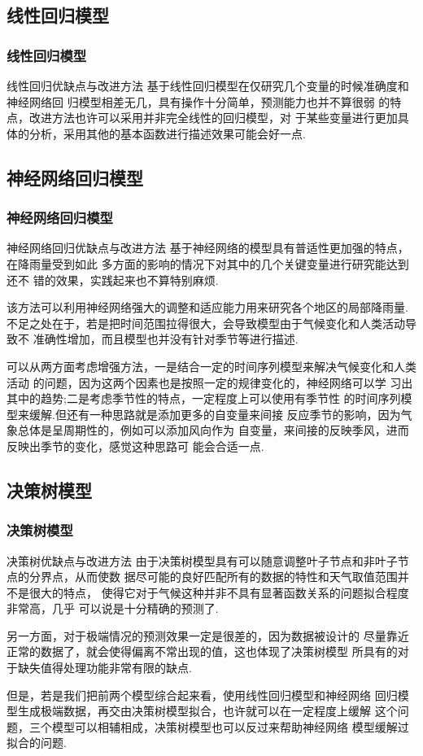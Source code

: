 \documentclass[10pt]{beamer}
\begin{document}
\subsection{线性回归模型}
\begin{frame}
	\frametitle{线性回归模型}
	\begin{block}{线性回归优缺点与改进方法}
		基于线性回归模型在仅研究几个变量的时候准确度和神经网络回
		归模型相差无几，具有操作十分简单，预测能力也并不算很弱
		的特点，改进方法也许可以采用并非完全线性的回归模型，对
		于某些变量进行更加具体的分析，采用其他的基本函数进行描述效果可能会好一点.
	\end{block}
\end{frame}

\subsection{神经网络回归模型}
\begin{frame}
	\frametitle{神经网络回归模型}
	\begin{block}{神经网络回归优缺点与改进方法}
		基于神经网络的模型具有普适性更加强的特点，在降雨量受到如此
		多方面的影响的情况下对其中的几个关键变量进行研究能达到还不
		错的效果，实践起来也不算特别麻烦.

		该方法可以利用神经网络强大的调整和适应能力用来研究各个地区的局部降雨量.
		不足之处在于，若是把时间范围拉得很大，会导致模型由于气候变化和人类活动导致不
		准确性增加，而且模型也并没有针对季节等进行描述.

		可以从两方面考虑增强方法，一是结合一定的时间序列模型来解决气候变化和人类活动
		的问题，因为这两个因素也是按照一定的规律变化的，神经网络可以学
		习出其中的趋势;二是考虑季节性的特点，一定程度上可以使用有季节性
		的时间序列模型来缓解.但还有一种思路就是添加更多的自变量来间接
		反应季节的影响，因为气象总体是呈周期性的，例如可以添加风向作为
		自变量，来间接的反映季风，进而反映出季节的变化，感觉这种思路可
		能会合适一点.
	\end{block}
\end{frame}

\subsection{决策树模型}
\begin{frame}
	\frametitle{决策树模型}
	\begin{block}{决策树优缺点与改进方法}
		由于决策树模型具有可以随意调整叶子节点和非叶子节点的分界点，从而使数
		据尽可能的良好匹配所有的数据的特性和天气取值范围并不是很大的特点，
		使得它对于气候这种并非不具有显著函数关系的问题拟合程度非常高，几乎
		可以说是十分精确的预测了.

		另一方面，对于极端情况的预测效果一定是很差的，因为数据被设计的
		尽量靠近正常的数据了，就会使得偏离不常出现的值，这也体现了决策树模型
		所具有的对于缺失值得处理功能非常有限的缺点.

		但是，若是我们把前两个模型综合起来看，使用线性回归模型和神经网络
		回归模型生成极端数据，再交由决策树模型拟合，也许就可以在一定程度上缓解
		这个问题，三个模型可以相辅相成，决策树模型也可以反过来帮助神经网络
		模型缓解过拟合的问题.
	\end{block}
\end{frame}
\end{document}
